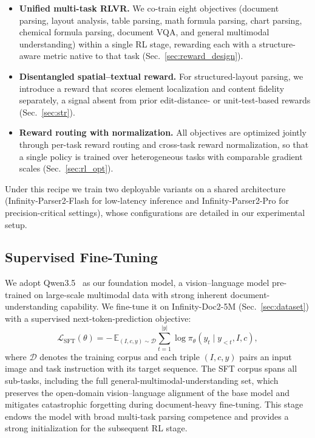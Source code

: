 \begin{itemize}[leftmargin=1.0em, labelsep=0.5em]
    \item \textbf{Unified multi-task RLVR.} We co-train eight objectives (document parsing, layout analysis, table parsing, math formula parsing, chart parsing, chemical formula parsing, document VQA, and general multimodal understanding) within a single RL stage, rewarding each with a structure-aware metric native to that task (Sec.~\ref{sec:reward_design}).
    \item \textbf{Disentangled spatial--textual reward.} For structured-layout parsing, we introduce a reward that scores element localization and content fidelity separately, a signal absent from prior edit-distance- or unit-test-based rewards (Sec.~\ref{sec:str}).
    \item \textbf{Reward routing with normalization.} All objectives are optimized jointly through per-task reward routing and cross-task reward normalization, so that a single policy is trained over heterogeneous tasks with comparable gradient scales (Sec.~\ref{sec:rl_opt}).
\end{itemize}

Under this recipe we train two deployable variants on a shared architecture (Infinity-Parser2-Flash for low-latency inference and Infinity-Parser2-Pro for precision-critical settings), whose configurations are detailed in our experimental setup.

\subsection{Supervised Fine-Tuning}
\label{sec:sft}

We adopt Qwen3.5~\cite{qwen3.5} as our foundation model, a vision--language model pre-trained on large-scale multimodal data with strong inherent document-understanding capability. We fine-tune it on Infinity-Doc2-5M (Sec.~\ref{sec:dataset}) with a supervised next-token-prediction objective:
\begin{equation}
\mathcal{L}_{\mathrm{SFT}}(\theta) = -\,\mathbb{E}_{(I,c,y)\sim\mathcal{D}}\sum_{t=1}^{|y|}\log\pi_\theta\!\left(y_t \mid y_{<t}, I, c\right),
\end{equation}
where $\mathcal{D}$ denotes the training corpus and each triple $(I,c,y)$ pairs an input image and task instruction with its target sequence. The SFT corpus spans all sub-tasks, including the full general-multimodal-understanding set, which preserves the open-domain vision--language alignment of the base model and mitigates catastrophic forgetting during document-heavy fine-tuning. This stage endows the model with broad multi-task parsing competence and provides a strong initialization for the subsequent RL stage.

